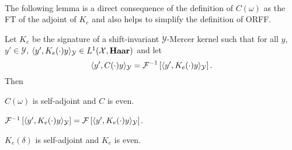 \paragraph{}
The following lemma is a direct consequence of the definition of $C(\omega)$ as
the \acl{FT} of the adjoint of $K_e$ and also helps to simplify the definition
of \acs{ORFF}.
\begin{lemma}
    \label{lm:C_characterization}
    Let $K_e$ be the signature of a shift-invariant $\mathcal{Y}$-Mercer kernel
    such that for all $y$, $y'\in\mathcal{Y}$, $\langle y',
    K_e(\cdot)y\rangle_{\mathcal{Y}}\in L^1(\mathcal{X},\mathbf{Haar})$ and let
    \begin{dmath*}
        \inner{y', C(\cdot)y}_{\mathcal{Y}}=\IFT{\inner{y',
        K_e(\cdot)y}_{\mathcal{Y}}}.
    \end{dmath*}
    Then
    \begin{lemmaenum}
        \item \label{lm:C_characterization_1} $C(\omega)$ is self-adjoint and
        $C$ is even.
        \item \label{lm:C_characterization_2} $\mathcal{F}^{-1}\left[\langle y',
        K_e(\cdot)y\rangle_{\mathcal{Y}}\right] = \mathcal{F}\left[\langle y',
        K_e(\cdot)y\rangle_{\mathcal{Y}}\right]$.
        \item \label{lm:C_characterization_3} $K_e(\delta)$ is self-adjoint and
        $K_e$ is even.
    \end{lemmaenum}
\end{lemma}
